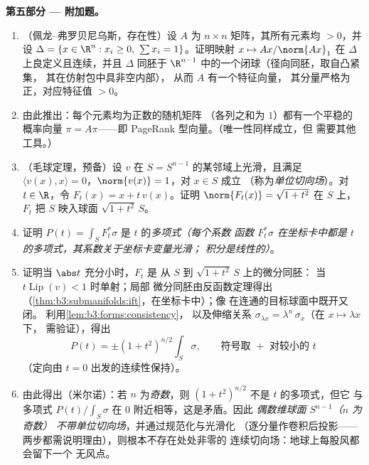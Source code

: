 \begin{problem}
\medskip
\noindent\textbf{第五部分 --- 附加题。}
\begin{enumerate}[resume]
  \item （佩龙–弗罗贝尼乌斯，存在性）设 $A$ 为
        $n\times n$ 矩阵，其所有元素均 $> 0$，并设
        $\Delta = \{x \in \R^n : x_i \geq 0,\ \sum x_i =
        1\}$。证明映射 $x \mapsto Ax/\norm{Ax}_1$
        在 $\Delta$ 上良定义且连续，并且
        $\Delta$ 同胚于
        $\R^{n-1}$ 中的一个闭球（径向同胚，取自凸紧集，
        其在仿射包中具非空内部），
        从而 $A$ 有一个特征向量，
        其分量严格为正，对应特征值 $> 0$。
  \item 由此推出：每个元素均为正数的随机矩阵
        （各列之和为 $1$）都有一个平稳的
        概率向量 $\pi = A\pi$——即
        PageRank 型向量。（唯一性同样成立，但
        需要其他工具。）
  \item （毛球定理，预备）设 $v$ 在
        $S = S^{n-1}$ 的某邻域上光滑，且满足 $\langle v(x),
        x\rangle = 0$，$\norm{v(x)} = 1$，对 $x \in S$ 成立
        （称为\emph{单位切向场}）。对 $t \in \R$，令
        $F_t(x) = x + t\,v(x)$。证明
        $\norm{F_t(x)} = \sqrt{1 + t^2}$ 在 $S$ 上，$F_t$ 把
        $S$ 映入球面 $\sqrt{1+t^2}\,S$。
  \item 证明 $P(t) = \int_SF_t^*\sigma$ 是
        $t$ 的\emph{多项式}\emph{（每个系数
        函数 $F_t^*\sigma$ 在坐标卡中都是
        $t$ 的多项式，其系数关于坐标卡变量光滑；
        积分是线性的）}。
  \item 证明当 $\abs t$ 充分小时，$F_t$ 是
        从 $S$ 到 $\sqrt{1+t^2}\,S$ 上的微分同胚：
        当 $t\operatorname{Lip}(v) < 1$ 时单射；局部
        微分同胚由反函数定理得出
        （\cref{thm:b3:submanifolds:ift}，在坐标卡中）；像
        在连通的目标球面中既开又闭。
        利用\cref{lem:b3:forms:consistency}，
        以及伸缩关系 $\sigma_{\lambda x} =
        \lambda^{n}\,\sigma_x$（在 $x \mapsto \lambda x$ 下，
        需验证），得出
        \[
        P(t) = \pm(1 + t^2)^{n/2}\int_S\sigma,
        \qquad\text{符号取 } + \text{ 对较小的 } t
        \]
        （定向由 $t = 0$ 出发的连续性保持）。
  \item 由此得出（米尔诺）：若 $n$ 为\emph{奇数}，则 $(1 +
        t^2)^{n/2}$ 不是 $t$ 的多项式，但它
        与多项式 $P(t)/\int_S\sigma$ 在
        $0$ 附近相等，这是矛盾。因此\emph{
        偶数维球面 $S^{n-1}$（$n$ 为奇数）
        不带单位切向场}，并通过规范化与光滑化
        （逐分量作卷积后投影——
        两步都需说明理由），则根本不存在处处非零的
        连续切向场：地球上每股风都会留下一个
        无风点。


\end{enumerate}
\end{problem}
